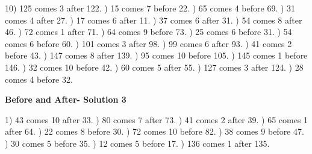 \documentclass{article}%
\begin{document}
10) 125 comes 3 after 122.%
) 15 comes 7 before 22.%
) 65 comes 4 before 69.%
) 31 comes 4 after 27.%
) 17 comes 6 after 11.%
) 37 comes 6 after 31.%
) 54 comes 8 after 46.%
) 72 comes 1 after 71.%
) 64 comes 9 before 73.%
) 25 comes 6 before 31.%
) 54 comes 6 before 60.%
) 101 comes 3 after 98.%
) 99 comes 6 after 93.%
) 41 comes 2 before 43.%
) 147 comes 8 after 139.%
) 95 comes 10 before 105.%
) 145 comes 1 before 146.%
) 32 comes 10 before 42.%
) 60 comes 5 after 55.%
) 127 comes 3 after 124.%
) 28 comes 4 before 32.%
\newline%
\newpage%
\large%
\begin{center}%
\textbf{Before and After- Solution 3}%
\newline%
\end{center} \normalsize%
1) 43 comes 10 after 33.%
) 80 comes 7 after 73.%
) 41 comes 2 after 39.%
) 65 comes 1 after 64.%
) 22 comes 8 before 30.%
) 72 comes 10 before 82.%
) 38 comes 9 before 47.%
) 30 comes 5 before 35.%
) 12 comes 5 before 17.%
) 136 comes 1 after 135.%
\newline%
\end{document}
